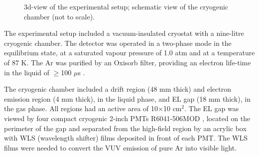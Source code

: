 \documentclass[a4paper,11pt]{article}
\begin{document}
\begin{figure}[ht!]
\vfill \centering {}
\hfill
\caption{ 3d-view of the experimental setup;  schematic view of the cryogenic chamber (not to scale).}
\end{figure}

The experimental setup included a vacuum-insulated cryostat with a nine-litre cryogenic chamber. The detector was operated in a two-phase mode in the equilibrium state, at a saturated vapour pressure of 1.0 atm and at a temperature of 87 K. The Ar was purified by an Oxisorb filter, providing an electron life-time in the liquid of $\ge$100 $\mu$s  \cite{CRADELGap17}.

The cryogenic chamber included a drift region (48 mm thick) and electron emission region (4 mm thick), in the liquid phase, and EL gap (18 mm thick), in the gas phase. All regions had an active area of
10$\times$10 cm$^2$.  The EL gap was viewed by four compact cryogenic 2-inch PMTs R6041-506MOD \cite{CryoPMT15}, located on the perimeter of the gap and separated from the high-field region by an acrylic box with WLS (wavelength shifter) films deposited in front of each PMT. The WLS films were needed to convert the VUV emission of pure Ar into visible light.
\end{document}
